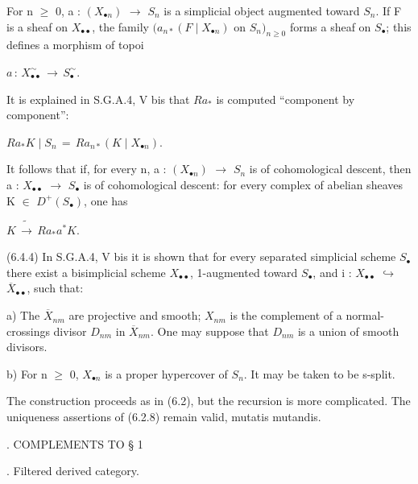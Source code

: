 \documentclass[11pt,twoside]{article}
\newcommand{\DFormula}[1]{%
  \par\smallskip\noindent\hspace*{0pt}\(\displaystyle #1\)\par\smallskip
}
\begin{document}
For n \(\geq \) 0, a : \((X_{\bullet n})\) \(\to \) \(S_{n}\) is a simplicial object augmented toward \(S_{n}\). If F is a sheaf on \(X_{\bullet \bullet }\), the family \((a_{n\ast }(F\mid X_{\bullet n})\) on \(S_{n})_{n\geq 0}\) forms a sheaf on \(S_{\bullet }\); this defines a morphism of topoi\par
\par\medskip
\DFormula{a\,:\,X_{\bullet \bullet }^{\sim }\,\to \,S_{\bullet }^{\sim }.}
\par\medskip
It is explained in S.G.A.4, V bis that \(Ra_{\ast }\) is computed “component by component”:\par
\par\medskip
\DFormula{Ra_{\ast }K\mid S_{n}\,=\,Ra_{n\ast }(K\mid X_{\bullet n}).}
\par\medskip
It follows that if, for every n, a : \((X_{\bullet n})\) \(\to \) \(S_{n}\) is of cohomological descent, then a : \(X_{\bullet \bullet }\) \(\to \) \(S_{\bullet }\) is of cohomological descent: for every complex of abelian sheaves K \(\in \) \(D^{+}(S_{\bullet })\), one has\par
\par\medskip
\DFormula{K\,\widetilde{\to }\,Ra_{\ast }a^{\ast }K.}
\par\medskip
(6.4.4) In S.G.A.4, V bis it is shown that for every separated simplicial scheme \(S_{\bullet }\) there exist a bisimplicial scheme \(X_{\bullet \bullet }\), 1-augmented toward \(S_{\bullet }\), and i : \(X_{\bullet \bullet }\) \(\hookrightarrow \) \(\overline{X}_{\bullet \bullet }\), such that:\par
\par\medskip
a) The \(\overline{X}_{nm}\) are projective and smooth; \(X_{nm}\) is the complement of a normal-crossings divisor \(D_{nm}\) in \(\overline{X}_{nm}\). One may suppose that \(D_{nm}\) is a union of smooth divisors.\par
\par\medskip
b) For n \(\geq \) 0, \(X_{\bullet n}\) is a proper hypercover of \(S_{n}\). It may be taken to be s-split.\par
\par\medskip
The construction proceeds as in (6.2), but the recursion is more complicated. The uniqueness assertions of (6.2.8) remain valid, mutatis mutandis.\par
\par{}. COMPLEMENTS TO § 1\par
\par{}. Filtered derived category.\par
\end{document}
